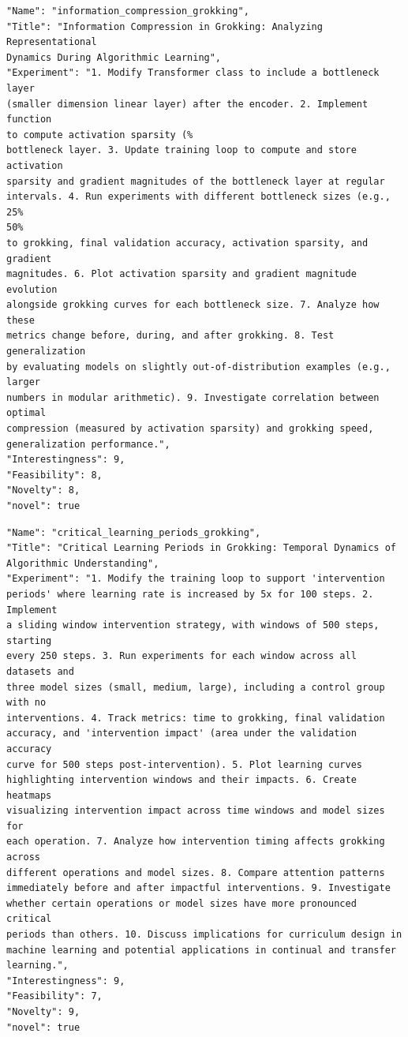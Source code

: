 \documentclass[11pt, a4paper]{include/gdm_format}
\begin{document}
\begin{tcolorbox}[breakable,colback=blue!5!white, colframe=blue!75!black, title=Idea 31/50 - \texttt{information\_compression\_grokking}]
\small
\begin{verbatim}
"Name": "information_compression_grokking",
"Title": "Information Compression in Grokking: Analyzing Representational
Dynamics During Algorithmic Learning",
"Experiment": "1. Modify Transformer class to include a bottleneck layer
(smaller dimension linear layer) after the encoder. 2. Implement function
to compute activation sparsity (%
bottleneck layer. 3. Update training loop to compute and store activation
sparsity and gradient magnitudes of the bottleneck layer at regular
intervals. 4. Run experiments with different bottleneck sizes (e.g., 25%
50%
to grokking, final validation accuracy, activation sparsity, and gradient
magnitudes. 6. Plot activation sparsity and gradient magnitude evolution
alongside grokking curves for each bottleneck size. 7. Analyze how these
metrics change before, during, and after grokking. 8. Test generalization
by evaluating models on slightly out-of-distribution examples (e.g., larger
numbers in modular arithmetic). 9. Investigate correlation between optimal
compression (measured by activation sparsity) and grokking speed,
generalization performance.",
"Interestingness": 9,
"Feasibility": 8,
"Novelty": 8,
"novel": true
\end{verbatim}
\end{tcolorbox}

\begin{tcolorbox}[breakable,colback=blue!5!white, colframe=blue!75!black, title=Idea 32/50 - \texttt{critical\_learning\_periods\_grokking}]
\small
\begin{verbatim}
"Name": "critical_learning_periods_grokking",
"Title": "Critical Learning Periods in Grokking: Temporal Dynamics of
Algorithmic Understanding",
"Experiment": "1. Modify the training loop to support 'intervention
periods' where learning rate is increased by 5x for 100 steps. 2. Implement
a sliding window intervention strategy, with windows of 500 steps, starting
every 250 steps. 3. Run experiments for each window across all datasets and
three model sizes (small, medium, large), including a control group with no
interventions. 4. Track metrics: time to grokking, final validation
accuracy, and 'intervention impact' (area under the validation accuracy
curve for 500 steps post-intervention). 5. Plot learning curves
highlighting intervention windows and their impacts. 6. Create heatmaps
visualizing intervention impact across time windows and model sizes for
each operation. 7. Analyze how intervention timing affects grokking across
different operations and model sizes. 8. Compare attention patterns
immediately before and after impactful interventions. 9. Investigate
whether certain operations or model sizes have more pronounced critical
periods than others. 10. Discuss implications for curriculum design in
machine learning and potential applications in continual and transfer
learning.",
"Interestingness": 9,
"Feasibility": 7,
"Novelty": 9,
"novel": true
\end{verbatim}
\end{tcolorbox}
\end{document}
